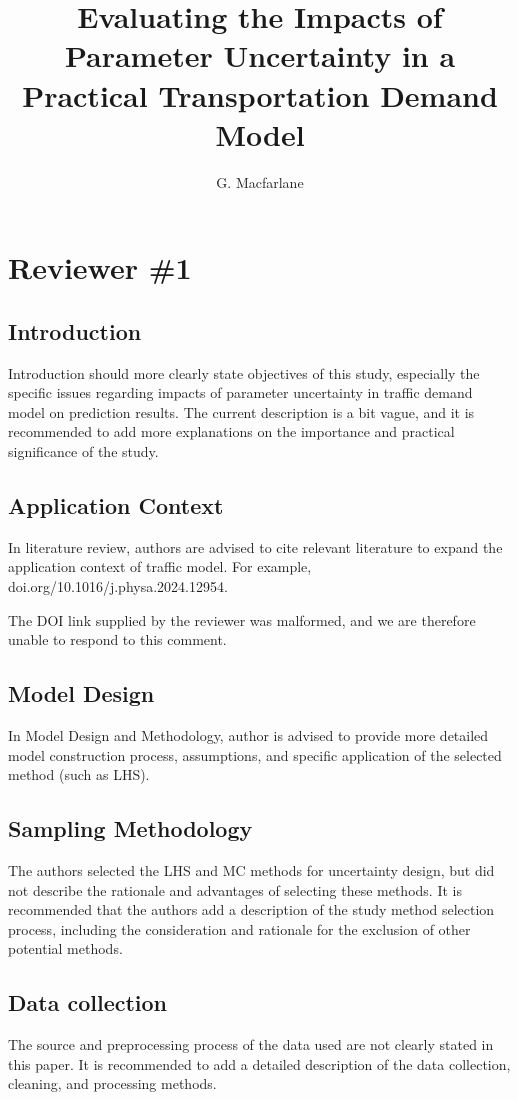 \documentclass{ar2rc}
\title{Evaluating the Impacts of Parameter Uncertainty in a Practical Transportation Demand Model}
\author{G. Macfarlane}
\begin{document}
\maketitle

\section{Reviewer \#1}

\subsection{Introduction}
\RC Introduction should more clearly state objectives of this study, especially the specific issues regarding impacts of parameter uncertainty in traffic demand model on prediction results. The current description is a bit vague, and it is recommended to add more explanations on the importance and practical significance of the study.


\subsection{Application Context}
\RC In literature review, authors are advised to cite relevant literature to expand the application context of traffic model. For example, doi.org/10.1016/j.physa.2024.12954.

\AR The DOI link supplied by the reviewer was malformed, and we are therefore unable to respond to this comment.

\subsection{Model Design}
\RC In Model Design and Methodology, author is advised to provide more detailed model construction process, assumptions, and specific application of the selected method (such as LHS).

\subsection{Sampling Methodology}
\RC The authors selected the LHS and MC methods for uncertainty design, but did not describe the rationale and advantages of selecting these methods. It is recommended that the authors add a description of the study method selection process, including the consideration and rationale for the exclusion of other potential methods.

\subsection{Data collection}
\RC The source and preprocessing process of the data used are not clearly stated in this paper. It is recommended to add a detailed description of the data collection, cleaning, and processing methods.
\end{document}
